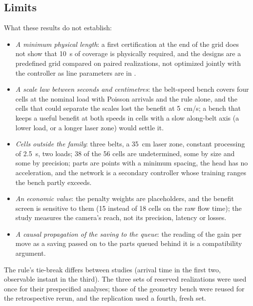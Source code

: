 \documentclass[11pt,a4paper]{article}
\begin{document}
\subsection{Limits}\label{sec:limits}
What these results do not establish:
\begin{itemize}[nosep]
\item \emph{A minimum physical length}: a first certification at the end of the grid does
  not show that 10~s of coverage is physically required, and the designs are a predefined
  grid compared on paired realizations, not optimized jointly with the controller as line
  parameters are in \cite{Sarker2001}.
\item \emph{A scale law between seconds and centimetres}: the belt-speed bench covers four
  cells at the nominal load with Poisson arrivals and the rule alone, and the cells that
  could separate the scales lost the benefit at 5~cm/s; a bench that keeps a useful benefit
  at both speeds in cells with a slow along-belt axis (a lower load, or a longer laser zone)
  would settle it.
\item \emph{Cells outside the family}: three belts, a 35~cm laser zone, constant processing
  of 2.5~s, two loads; 38 of the 56 cells are undetermined, some by size and some by
  precision; parts are points with a minimum spacing, the head has no acceleration, and the
  network is a secondary controller whose training ranges the bench partly exceeds.
\item \emph{An economic value}: the penalty weights are placeholders, and the benefit
  screen is sensitive to them (15 instead of 18 cells on the raw flow time); the study
  measures the camera's reach, not its precision, latency or losses.
\item \emph{A causal propagation of the saving to the queue}: the reading of the gain per
  move as a saving passed on to the parts queued behind it is a compatibility argument.
\end{itemize}
The rule's tie-break differs between studies (arrival time in the first two, observable
instant in the third). The three sets of reserved realizations were used once for their
prespecified analyses; those of the geometry bench were reused for the retrospective
rerun, and the replication used a fourth, fresh set.

\end{document}
